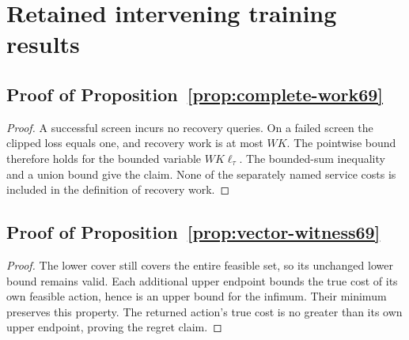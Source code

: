 \section{Retained intervening training results}\label{supp:retained69}
\subsection{Proof of Proposition~\ref{prop:complete-work69}}\label{supp:retained69-proof1}
\begin{proof}
A successful screen incurs no recovery queries. On a failed screen the clipped loss equals one, and recovery work is at most $WK$. The pointwise bound therefore holds for the bounded variable $WK\ell_\tau$. The bounded-sum inequality and a union bound give the claim. None of the separately named service costs is included in the definition of recovery work.
\end{proof}
\subsection{Proof of Proposition~\ref{prop:vector-witness69}}\label{supp:retained69-proof2}
\begin{proof}
The lower cover still covers the entire feasible set, so its unchanged lower bound remains valid. Each additional upper endpoint bounds the true cost of its own feasible action, hence is an upper bound for the infimum. Their minimum preserves this property. The returned action's true cost is no greater than its own upper endpoint, proving the regret claim.
\end{proof}
